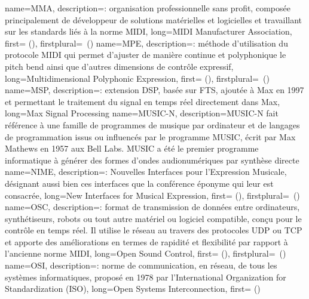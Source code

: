 {
    name={MMA},
    description={\textit{}: organisation professionnelle sans profit, composée principalement de développeur de solutions matérielles et logicielles et travaillant sur les standards liés à la norme MIDI},
    long={MIDI Manufacturer Association},
    first={ ()},
    firstplural={\glspluralsuffix\ (\glspluralsuffix)}
}
{
    name={MPE},
    description={\textit{}: méthode d'utilisation du protocole MIDI qui permet d'ajuster de manière continue et polyphonique le pitch bend ainsi que d'autres dimensions de contrôle expressif},
    long={Multidimensional Polyphonic Expression},
   	first={ ()},
    firstplural={\glspluralsuffix\ (\glspluralsuffix)}
}
{
    name={MSP},
    description={\textit{}: extension \gls{DSP}, basée sur \gls{FTS}, ajoutée à Max en 1997 et permettant le traitement du signal en temps réel directement dans Max},
    long={Max Signal Processing}
}
{
    name={MUSIC-N},
    description={MUSIC-N fait référence à une famille de programmes de musique par ordinateur et de langages de programmation issus ou influencés par le programme MUSIC, écrit par Max Mathews en 1957 aux Bell Labs. MUSIC a été le premier programme informatique à générer des formes d'ondes audionumériques par synthèse directe}
}
{
    name={NIME},
    description={\textit{}: Nouvelles Interfaces pour l'Expression Musicale, désignant aussi bien ces interfaces que la conférence éponyme qui leur est consacrée},
    long={New Interfaces for Musical Expression},
    first={ ()},
    firstplural={\glspluralsuffix\ (\glspluralsuffix)}
}
{
    name={OSC},
    description={\textit{}: format de transmission de données entre ordinateurs, synthétiseurs, robots ou tout autre matériel ou logiciel compatible, conçu pour le contrôle en temps réel. Il utilise le réseau au travers des protocoles \gls{UDP} ou \gls{TCP} et apporte des améliorations en termes de rapidité et flexibilité par rapport à l'ancienne norme MIDI},
    long={Open Sound Control},
    first={ ()},
    firstplural={\glspluralsuffix\ (\glspluralsuffix)}
}
{
    name={OSI},
    description={\textit{}: norme de communication, en réseau, de tous les systèmes informatiques, proposé en 1978 par l'International Organization for Standardization (ISO)},
    long={Open Systems Interconnection},
    first={ ()}
}
